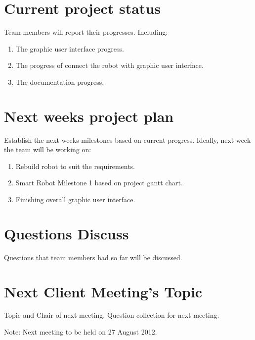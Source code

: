 \documentclass[11pt, a4paper]{article}
\begin{document}
\section{Current project status}
Team members will report their progresses. Including:
\begin{enumerate}
	\item  The graphic user interface progress.
	\item  The progress of connect the robot with graphic user interface.
	\item  The documentation progress.
\end{enumerate}


\section{Next weeks project plan}
Establish the next weeks milestones based on current progress. Ideally, next week the team will be working on:  
\begin{enumerate}
	\item Rebuild robot to suit the requirements.
	\item Smart Robot Milestone 1 based on project gantt chart. 
	\item Finishing overall graphic user interface.
\end{enumerate}

\section{Questions Discuss}
Questions that team members had so far will be discussed.

\section{Next Client Meeting's Topic}
Topic and Chair of next meeting. Question collection for next meeting. 

\vspace*{10pt}
\noindent Note: Next meeting to be held on 27 August 2012.
\end{document}
